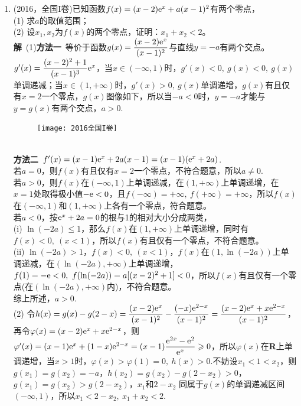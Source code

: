 \begin{enumerate}[label={【\textbf{例\thechapter.\arabic*}】},
 leftmargin=\inteval{\myenumleftmargin}pt,
 itemsep=\inteval{\myenumitempsep}pt,
 itemindent=\inteval{\myenumitemindent}pt]
\item (2016，全国I卷)已知函数$ f(x)=(x-2)\mathrm{e}^{x}+a(x-1)^2 $有两个零点， \\
(1) 求$ a $的取值范围；\\
(2) 设$ x_1,x_2 $为$ f(x) $的两个零点，证明：$ x_1+x_2<2 $。\\
\textbf{解}\ (1)\textbf{方法一}\ 等价于函数$ g(x)=\dfrac{(x-2)\mathrm{e}^x}{(x-1)^2} $与直线$ y=-a $有两个交点。$ g'(x)=\dfrac{(x-2)^2+1}{(x-1)^3} \mathrm{e}^x $，当$ x\in(-\infty,1) $时，$ g'(x)<0,\ g(x)<0,\ g(x) $单调递减；当$ x\in(1, +\infty) $时，$ g'(x)>0,\ g(x) $单调递增，$ g(x) $有且仅有$ x=2 $一个零点，$ g(x) $图像如下，所以当$ -a<0 $时，$ y=-a $才能与$ y=g(x) $有两个交点，$a>0 $.
\begin{figure}[h]
    \centering
    \texttt{[image: 2016全国I卷]}
\end{figure} \\
\textbf{方法二}\ $ f'(x)=(x-1)\mathrm{e}^x+2a(x-1)=(x-1)(\mathrm{e}^x+2a) $.\\
 若$ a=0 $，则$ f(x) $有且仅有$ x=2 $一个零点，不符合题意，所以$ a\neq 0 $.\\
 若$ a>0 $，则$ f(x) $在$ (-\infty,1) $上单调递减，在$ (1,+\infty) $上单调递增，在$ x=1 $处取得极小值$ -\mathrm{e}<0 $，且$ f(-\infty)=+\infty,\ f(+\infty)=+\infty $，所以$ f(x) $在$ (-\infty,1) $和$ (1,+\infty) $上各有一个零点，符合题意。\\
 若$ a<0 $，按$ \mathrm{e}^x+2a=0 $的根与1的相对大小分成两类，\\
(i) $ \ln(-2a)\leq 1 $，那么$ f(x) $在$ (1,+\infty) $上单调递增，同时有$ f(x)<0,\ (x<1) $，所以$ f(x) $有且仅有一个零点，不符合题意。\\
(ii) $ \ln(-2a)> 1 $，$ f(x)<0,\ (x<1) $，$ f(x) $在$ (1,\ln(-2a)) $上单调递减，在$ (\ln(-2a),+\infty) $上单调递增，$ f(1)=-\e<0,\ f(\ln(-2a))=a[(x-2)^2+1]<0 $，所以$ f(x) $有且仅有一个零点(在$ (\ln(-2a),+\infty) $内)，不符合题意。\\
综上所述，$ a>0 $. \\
(2) 令$ h(x)=g(x)-g(2-x)=\dfrac{(x-2)\mathrm{e}^x}{(x-1)^2}-\dfrac{(-x)\mathrm{e}^{2-x}}{(x-1)^2}=\dfrac{(x-2)\mathrm{e}^x+x\mathrm{e}^{2-x}}{(x-1)^2} $，再令$ \varphi(x)=(x-2)\mathrm{e}^x+x\mathrm{e}^{2-x} $，则$ \varphi'(x)=(x-1)\mathrm{e}^x+(1-x)\mathrm{e}^{2-x}=(x-1)\dfrac{\mathrm{e}^{2x}-\mathrm{e}^{2}}{\mathrm{e}^x}\geqslant 0 $，所以$ \varphi(x) $在\textbf{R}上单调递增，当$ x>1 $时，$ \varphi(x)>\varphi(1)=0,\ h(x)>0 $.不妨设$ x_1<1<x_2 $，则$ g(x_1)=g(x_2)=-a $，$ h(x_2)=g(x_2)-g(2-x_2)>0 $，$ g(x_1)=g(x_2)>g(2-x_2) $，$ x_1 $和$ 2-x_2 $
同属于$ g(x) $的单调递减区间$ (-\infty,1) $，所以$ x_1<2-x_2,\ x_1+x_2<2 $. 


\end{enumerate}

